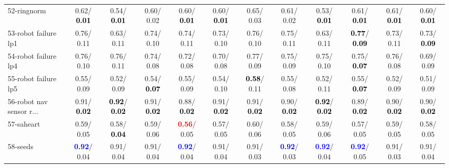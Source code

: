 \begin{table}[h]
\begin{center}
{\begin{tabular}{lc|c|c|c|c|c|c|c|c|c|c}
52-ringnorm &   0.62/\textcolor{black}{\textbf{  0.01}} &   0.54/\textcolor{black}{\textbf{  0.01}} &   0.60/  0.02 &   0.60/\textcolor{black}{\textbf{  0.01}} &   0.60/\textcolor{black}{\textbf{  0.01}} &   0.65/  0.03 &   0.61/  0.02 &   0.53/\textcolor{black}{\textbf{  0.01}} &   0.61/\textcolor{black}{\textbf{  0.01}} &   0.61/\textcolor{black}{\textbf{  0.01}} &   0.60/\textcolor{black}{\textbf{  0.01}} \\
53-robot failure lp1 &   0.76/  0.11 &   0.63/  0.11 &   0.74/  0.10 &   0.74/  0.11 &   0.73/  0.10 &   0.76/  0.10 &   0.75/  0.11 &   0.63/  0.11 & \textcolor{black}{\textbf{  0.77}}/\textcolor{black}{\textbf{  0.09}} &   0.73/  0.11 &   0.73/\textcolor{black}{\textbf{  0.09}} \\ \hline
54-robot failure lp4 &   0.76/  0.10 &   0.76/  0.11 &   0.74/  0.08 &   0.72/  0.08 &   0.70/  0.08 &   0.77/  0.09 &   0.75/  0.09 &   0.75/  0.10 &   0.75/\textcolor{black}{\textbf{  0.07}} &   0.76/  0.08 &   0.69/  0.09 \\
55-robot failure lp5 &   0.55/  0.09 &   0.52/  0.09 &   0.54/\textcolor{black}{\textbf{  0.07}} &   0.55/  0.09 &   0.54/  0.10 & \textcolor{black}{\textbf{  0.58}}/  0.11 &   0.55/  0.08 &   0.52/  0.11 &   0.55/\textcolor{black}{\textbf{  0.07}} &   0.52/  0.09 &   0.51/  0.09 \\
56-robot nav sensor r... &   0.91/\textcolor{black}{\textbf{  0.02}} & \textcolor{black}{\textbf{  0.92}}/\textcolor{black}{\textbf{  0.02}} &   0.91/\textcolor{black}{\textbf{  0.02}} &   0.88/\textcolor{black}{\textbf{  0.02}} &   0.91/\textcolor{black}{\textbf{  0.02}} &   0.91/\textcolor{black}{\textbf{  0.02}} &   0.90/\textcolor{black}{\textbf{  0.02}} & \textcolor{black}{\textbf{  0.92}}/\textcolor{black}{\textbf{  0.02}} &   0.89/\textcolor{black}{\textbf{  0.02}} &   0.90/\textcolor{black}{\textbf{  0.02}} &   0.90/\textcolor{black}{\textbf{  0.02}} \\
57-saheart &   0.59/  0.05 &   0.58/\textcolor{black}{\textbf{  0.04}} &   0.59/  0.06 & \textcolor{red}{\textbf{  0.56}}/  0.05 &   0.57/  0.05 &   0.60/  0.06 &   0.58/  0.05 &   0.59/  0.06 &   0.57/  0.05 &   0.59/  0.05 &   0.58/  0.05 \\
58-seeds & \textcolor{blue}{\textbf{  0.92}}/  0.04 &   0.91/  0.04 &   0.91/  0.04 & \textcolor{blue}{\textbf{  0.92}}/  0.04 &   0.91/  0.04 &   0.91/  0.03 & \textcolor{blue}{\textbf{  0.92}}/  0.03 & \textcolor{blue}{\textbf{  0.92}}/  0.04 & \textcolor{blue}{\textbf{  0.92}}/  0.05 &   0.91/  0.03 &   0.91/  0.04 \\

\end{tabular}}
\end{center}
\end{table}
